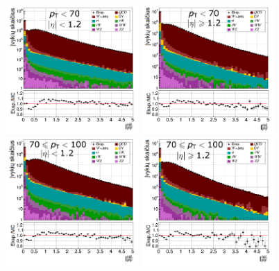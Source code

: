 \documentclass[a4paper, 12pt, oneside]{article}
\begin{document}
\begin{figure}[p!]
	\includegraphics[width=0.45\textwidth]{Kursinis3/TFit_DB_50to70.png}
	\includegraphics[width=0.45\textwidth]{Kursinis3/TFit_DE_50to70.png}
	\includegraphics[width=0.45\textwidth]{Kursinis3/TFit_DB_70to100.png}
	\includegraphics[width=0.45\textwidth]{Kursinis3/TFit_DE_70to100.png}

\end{figure}
\end{document}
